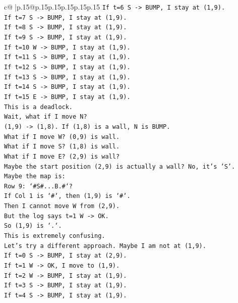 \documentclass{article}
\begin{document}
{\begin{supertabular}{c@{$\;$}|p{.15\linewidth}@{}p{.15\linewidth}p{.15\linewidth}p{.15\linewidth}p{.15\linewidth}p{.15\linewidth}}
{{{\texttt{If t=6 S {-}> BUMP, I stay at (1,9).} \\
\texttt{If t=7 S {-}> BUMP, I stay at (1,9).} \\
\texttt{If t=8 S {-}> BUMP, I stay at (1,9).} \\
\texttt{If t=9 S {-}> BUMP, I stay at (1,9).} \\
\texttt{If t=10 W {-}> BUMP, I stay at (1,9).} \\
\texttt{If t=11 S {-}> BUMP, I stay at (1,9).} \\
\texttt{If t=12 S {-}> BUMP, I stay at (1,9).} \\
\texttt{If t=13 S {-}> BUMP, I stay at (1,9).} \\
\texttt{If t=14 S {-}> BUMP, I stay at (1,9).} \\
\texttt{If t=15 E {-}> BUMP, I stay at (1,9).} \\
\texttt{This is a deadlock.} \\
\texttt{Wait, what if I move N?} \\
\texttt{(1,9) {-}> (1,8). If (1,8) is a wall, N is BUMP.} \\
\texttt{What if I move W? (0,9) is wall.} \\
\texttt{What if I move S? (1,8) is wall.} \\
\texttt{What if I move E? (2,9) is wall?} \\
\texttt{Maybe the start position (2,9) is actually a wall? No, it's 'S'.} \\
\texttt{Maybe the map is:} \\
\texttt{Row 9: `\#S\#...B.\#`?} \\
\texttt{If Col 1 is `\#`, then (1,9) is `\#`.} \\
\texttt{Then I cannot move W from (2,9).} \\
\texttt{But the log says t=1 W {-}> OK.} \\
\texttt{So (1,9) is `.`.} \\
\texttt{This is extremely confusing.} \\
\texttt{Let's try a different approach. Maybe I am not at (1,9).} \\
\texttt{If t=0 S {-}> BUMP, I stay at (2,9).} \\
\texttt{If t=1 W {-}> OK, I move to (1,9).} \\
\texttt{If t=2 W {-}> BUMP, I stay at (1,9).} \\
\texttt{If t=3 S {-}> BUMP, I stay at (1,9).} \\
\texttt{If t=4 S {-}> BUMP, I stay at (1,9).} \\
}}}
\end{supertabular}}
\end{document}
